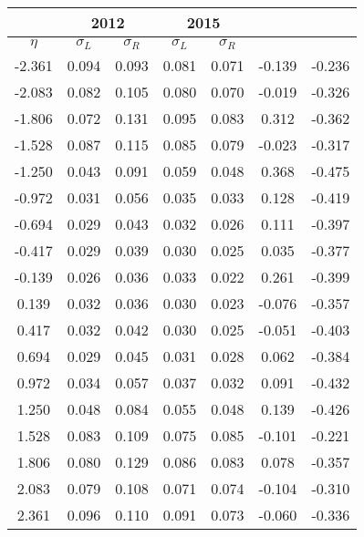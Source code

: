 \begin{table}
\begin{tabular}{|c|c|c||c|c||c|c|}
& \multicolumn{2}{c}{2012}& \multicolumn{2}{c}{2015} \\\hline
$\eta$ & $\sigma_L$ & $\sigma_R$& $\sigma_L$ & $\sigma_R$\\\hline
-2.361 & 0.094 & 0.093 & 0.081 & 0.071 & -0.139 & -0.236 \\\hline
-2.083 & 0.082 & 0.105 & 0.080 & 0.070 & -0.019 & -0.326 \\\hline
-1.806 & 0.072 & 0.131 & 0.095 & 0.083 & 0.312 & -0.362 \\\hline
-1.528 & 0.087 & 0.115 & 0.085 & 0.079 & -0.023 & -0.317 \\\hline
-1.250 & 0.043 & 0.091 & 0.059 & 0.048 & 0.368 & -0.475 \\\hline
-0.972 & 0.031 & 0.056 & 0.035 & 0.033 & 0.128 & -0.419 \\\hline
-0.694 & 0.029 & 0.043 & 0.032 & 0.026 & 0.111 & -0.397 \\\hline
-0.417 & 0.029 & 0.039 & 0.030 & 0.025 & 0.035 & -0.377 \\\hline
-0.139 & 0.026 & 0.036 & 0.033 & 0.022 & 0.261 & -0.399 \\\hline
0.139 & 0.032 & 0.036 & 0.030 & 0.023 & -0.076 & -0.357 \\\hline
0.417 & 0.032 & 0.042 & 0.030 & 0.025 & -0.051 & -0.403 \\\hline
0.694 & 0.029 & 0.045 & 0.031 & 0.028 & 0.062 & -0.384 \\\hline
0.972 & 0.034 & 0.057 & 0.037 & 0.032 & 0.091 & -0.432 \\\hline
1.250 & 0.048 & 0.084 & 0.055 & 0.048 & 0.139 & -0.426 \\\hline
1.528 & 0.083 & 0.109 & 0.075 & 0.085 & -0.101 & -0.221 \\\hline
1.806 & 0.080 & 0.129 & 0.086 & 0.083 & 0.078 & -0.357 \\\hline
2.083 & 0.079 & 0.108 & 0.071 & 0.074 & -0.104 & -0.310 \\\hline
2.361 & 0.096 & 0.110 & 0.091 & 0.073 & -0.060 & -0.336 \\\hline
\end{tabular}
\end{table}
